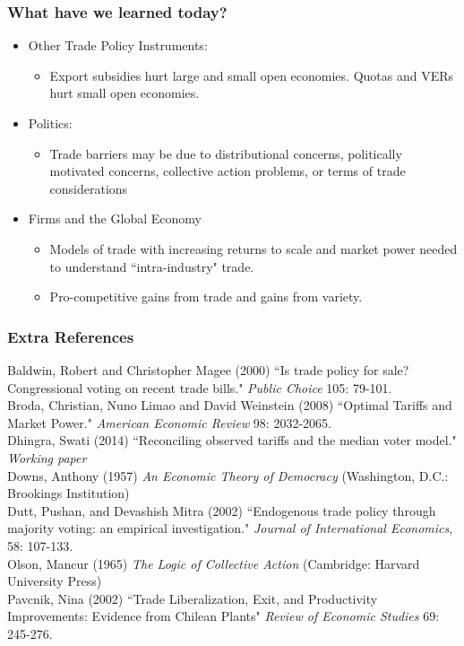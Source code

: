 \documentclass{beamer}
\begin{document}
\begin{frame}
	\frametitle{What have we learned today?}
	\begin{itemize}
		\item Other Trade Policy Instruments:	
			\begin{itemize}
				\item Export subsidies hurt large and small open economies. Quotas and VERs hurt small open economies.
			\end{itemize}
		\item Politics:
			\begin{itemize}
				\item Trade barriers may be due to distributional concerns, politically motivated concerns, collective action problems, or terms of trade considerations
			\end{itemize}
		\item Firms and the Global Economy
			\begin{itemize}
				\item Models of trade with increasing returns to scale and market power needed to understand ``intra-industry" trade.
				\item Pro-competitive gains from trade and gains from variety.
			\end{itemize}
	\end{itemize}
\end{frame}

\begin{frame}
	\frametitle{Extra References}
	\scriptsize
Baldwin, Robert and Christopher Magee (2000) ``Is trade policy for sale? Congressional voting on recent trade bills." \emph{Public Choice} 105: 79-101. \\ \vspace{2mm}
Broda, Christian, Nuno Limao and David Weinstein (2008) ``Optimal Tariffs and Market Power." \emph{American Economic Review} 98: 2032-2065. \\ \vspace{2mm}
Dhingra, Swati (2014) ``Reconciling observed tariffs and the median voter model." \emph{Working paper} \\ \vspace{2mm}
Downs, Anthony (1957) \emph{An Economic Theory of Democracy} (Washington, D.C.: Brookings Institution) \\ \vspace{2mm}
Dutt, Pushan, and Devashish Mitra (2002) ``Endogenous trade policy through majority voting: an empirical investigation." \emph{Journal of International Economics}, 58: 107-133. \\ \vspace{2mm}
Olson, Mancur (1965)  \emph{The Logic of Collective Action} (Cambridge: Harvard University Press) \\  \vspace{2mm}
Pavcnik, Nina (2002) ``Trade Liberalization, Exit, and Productivity Improvements: Evidence from Chilean Plants" \emph{Review of Economic Studies} 69: 245-276.
\end{frame}
\end{document}
